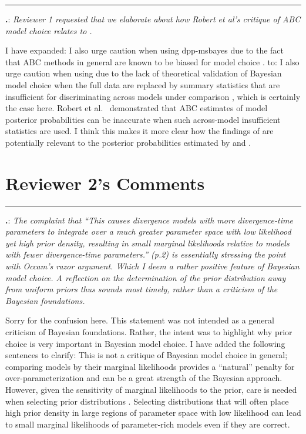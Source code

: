\documentclass[12pt]{article}
\newcounter{commentCounter}
\newcommand{\revcomment}[1]{{\addtocounter{commentCounter}{1}}
    \medskip \hrule \noindent
\textbf{\arabic{section}.\arabic{commentCounter}}: {\sl #1}\par\xspace}
\newcommand{\response}[1]{{\addtolength{\leftskip}{0.25in} #1\par}\xspace}
\let\quoteOld\quote
\let\endquoteOld\endquote
\renewenvironment{quote}{\sffamily\small\quoteOld}{\endquoteOld}
\begin{document}
\revcomment{
    Reviewer 1 requested that we elaborate about how Robert et al's
    \cite{Robert2011} critique of ABC model choice relates to \dppmsbayes.
}
\response{
    I have expanded:
    \begin{quote}
        I also urge caution when using dpp-msbayes due to the fact that ABC
        methods in general are known to be biased for model choice
        \cite{Robert2011}.
    \end{quote}
    to:
    \begin{quote}
        I also urge caution when using \dppmsbayes due to the lack of
        theoretical validation of Bayesian model choice when the full data are
        replaced by summary statistics that are insufficient for discriminating
        across models under comparison \cite{Robert2011}, which is certainly
        the case here.  Robert et al.\ \cite{Robert2011} demonstrated that ABC
        estimates of model posterior probabilities can be inaccurate when such
        across-model insufficient statistics are used.
    \end{quote}
    I think this makes it more clear how the findings of \cite{Robert2011} are
    potentially relevant to the posterior probabilities estimated by
    \dppmsbayes and \msb.
}

\section{Reviewer 2's Comments}\label{rev2}
\setcounter{commentCounter}{0}

\revcomment{
    The complaint that ``This causes divergence models with more divergence-time
    parameters to integrate over a much greater parameter space with low
    likelihood yet high prior density, resulting in small marginal likelihoods
    relative to models with fewer divergence-time parameters.'' (p.2) is
    essentially stressing the point with Occam's razor argument. Which I deem a
    rather positive feature of Bayesian model choice. A reflection on the
    determination of the prior distribution away from uniform priors thus
    sounds most timely, rather than a criticism of the Bayesian foundations.
}
\response{
    Sorry for the confusion here. This statement was not intended as
    a general criticism of Bayesian foundations. Rather, the intent was to
    highlight why prior choice is very important in Bayesian model choice.
    I have added the following sentences to clarify:
    \begin{quote}
        This is not a critique of Bayesian model choice in general; comparing
        models by their marginal likelihoods provides a ``natural'' penalty for
        over-parameterization and can be a great strength of the Bayesian
        approach.  However, given the sensitivity of marginal likelihoods to
        the prior, care is needed when selecting prior distributions
        \cite{Lindley1957}.  Selecting distributions that will often place high
        prior density in large regions of parameter space with low likelihood
        can lead to small marginal likelihoods of parameter-rich models even if
        they are correct.
    \end{quote}
}
\end{document}
